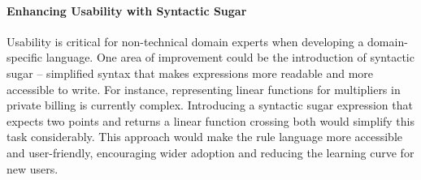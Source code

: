 \paragraph{Enhancing Usability with Syntactic Sugar}
Usability is critical for non-technical domain experts when developing a domain-specific language.
One area of improvement could be the introduction of syntactic sugar –
simplified syntax that makes expressions more readable and more accessible to write.
For instance, representing linear functions for multipliers in private billing is currently complex.
Introducing a syntactic sugar expression that expects two points
and returns a linear function crossing both would simplify this task considerably.
This approach would make the rule language more accessible and user-friendly,
encouraging wider adoption and reducing the learning curve for new users.

